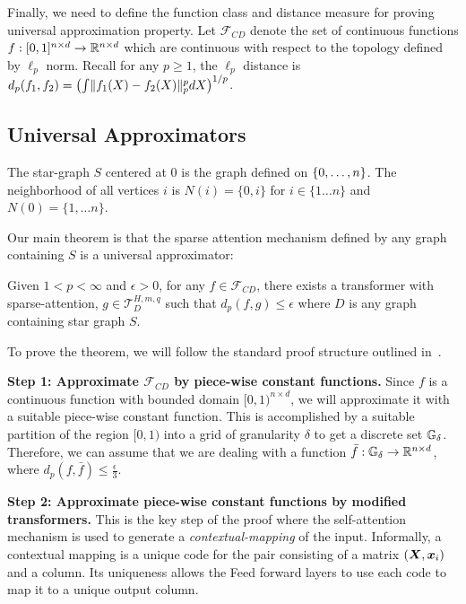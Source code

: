 Finally, we need to define the function class and distance measure for proving universal approximation property. 
Let $\mathcal{F}_{CD}$ denote the set of continuous functions $f: [0,1]^{n \times d} \to \mathbb{R}^{n \times d} $ 
which are continuous with respect to the topology defined by  $\ell_p$ norm. 
Recall for any  $p \geq 1$, the $\ell_p$ distance is $d_p(f_1,f_2)  = \left(\int \lVert f_1(X) - f_2(X)\rVert_p^p dX \right)^{1/p}$.

\subsection{Universal Approximators}
\begin{definition}
The star-graph $S$ centered at $0$ is the graph defined on $\{0,\dots, n\}$. 
The neighborhood of all vertices $i$ is $N(i) = \{0,i\} $  for $i \in \{1\dots n\}$ and 
$N(0) = \{1,\dots n\}$. 
\end{definition} 
Our main theorem is that the sparse attention mechanism defined by any graph containing $S$
is a universal approximator:
\begin{theorem}
\label{thm:universal}
    Given $1 < p < \infty$ and $\epsilon > 0 $, for any $f \in \mathcal{F}_{CD}$, there exists a 
    transformer with sparse-attention, $g \in \mathcal{T}_D^{H,m,q}$  such that 
    $d_p(f,g)\leq \epsilon$ where $D$ is any graph containing star graph $S$. 
\end{theorem}
To prove the theorem, we will follow the standard proof structure outlined in~\citep{Yun19}.

\textbf{Step 1: Approximate $\mathcal{F}_{CD}$ by piece-wise constant functions.} 
    Since $f$ is a continuous function with bounded domain $[0,1)^{n \times d}$, we will 
    approximate it with a  suitable piece-wise constant function. This is accomplished by a suitable partition of the  region $[0,1)$ into a grid of granularity $\delta$ to get a discrete set $\mathbb{G}_{\delta}$. Therefore, we can assume that we are dealing with a function 
    $\bar{f}: \mathbb{G}_{\delta} \to \mathbb{R}^{n \times d}$, where $d_p(f,\bar{f}) \leq \frac{\epsilon}{3}$. 
    
\textbf{Step 2:  Approximate piece-wise constant functions by modified transformers.} 
    This is the key step  of the proof where  the self-attention mechanism is used to generate a \emph{contextual-mapping} of the input. Informally, a contextual mapping is a unique code
    for the pair consisting of a matrix $({\bm{X}},{\bm{x}}_{i})$ and a column. Its uniqueness allows
    the Feed forward layers to use each code to map it to a unique output column. 
    
